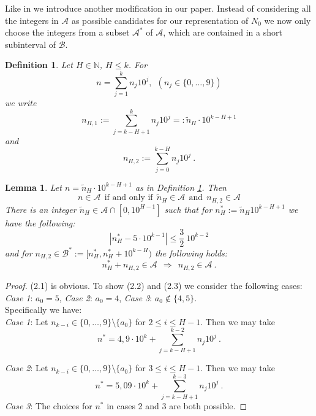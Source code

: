 \documentclass{amsart}
\newtheorem{lemma}[theorem]{Lemma}
\numberwithin{equation}{subsection}
\newtheorem{definition}[theorem]{Definition}
\begin{document}


Like in \cite{maier-rassias-gold} we introduce another modification in our paper. Instead of considering all the integers in $\mathcal{A}$ as possible candidates for our representation of $N_0$ we now only choose the integers from a subset $\mathcal{A}^*$ of $\mathcal{A}$, which are contained in a short subinterval of $\mathcal{B}$.

\begin{definition}\label{rdef23}
Let $H\in \mathbb{N}$, $H\leq k$. For 
$$n=\sum_{j=1}^k n_j 10^j,\ \ (n_j\in \{0, \ldots, 9\})$$
we write
$$n_{H,1}:= \sum_{j=k-H+1}^k n_j 10^j=: \tilde{n}_H\cdot 10^{k-H+1}$$
and
$$n_{H, 2}:= \sum_{j=0}^{k-H} n_j 10^j\:.$$
\end{definition}

\begin{lemma}\label{rlem24}
Let $n=\tilde{n}_H\cdot 10^{k-H+1}$ as in Definition \ref{rdef23}. Then
\[
n\in \mathcal{A}\ \ \text{if and only if}\ \ \tilde{n}_H\in \mathcal{A}\ \ \text{and}\ \ n_{H,2}\in\mathcal{A}\tag{2.1}
\]
There is an integer $\tilde{n}_H\in \mathcal{A}\cap [0, 10^{H-1}]$ such that for $n^*_H:= \tilde{n}_H 10^{k-H+1}$ we have the following:
\[
\left|n^*_H-5\cdot 10^{k-1}\right|\leq \frac{3}{2}\: 10^{k-2}  \tag{2.2}
\]
and for $n_{H, 2}\in \mathcal{B}^*:= [ n_H^*, n_H^*+10^{k-H} )$ the following holds:
\[
n^*_H+n_{H,2}\in \mathcal{A}\ \ \Rightarrow\ \ n_{H, 2}\in \mathcal{A}\:.  \tag{2.3}
\]
\end{lemma}
\begin{proof}
(2.1) is obvious. To show (2.2) and (2.3) we consider the following cases:\\
\textit{Case 1}: $a_0=5$, \textit{Case 2}: $a_0=4$, \textit{Case 3}: $a_0\not\in \{4, 5\}$.\\
Specifically we have:\\
\noindent \textit{Case 1}: Let $n_{k-i}\in \{0, \ldots, 9\}\setminus\{a_0\}$ for $2\leq i\leq H-1$. Then we may take
$$n^*=4,9\cdot 10^k+\sum_{j=k-H+1}^{k-2} n_j10^j\:.$$

\noindent \textit{Case 2}: Let  $n_{k-i}\in \{0, \ldots, 9\}\setminus\{a_0\}$ for $3\leq i\leq H-1$. Then we may take
$$n^*=5,09\cdot 10^k+\sum_{j=k-H+1}^{k-3} n_j10^j\:.$$
\noindent \textit{Case 3}: The choices for $n^*$ in cases 2 and 3 are both possible.
\end{proof}


\end{document}
